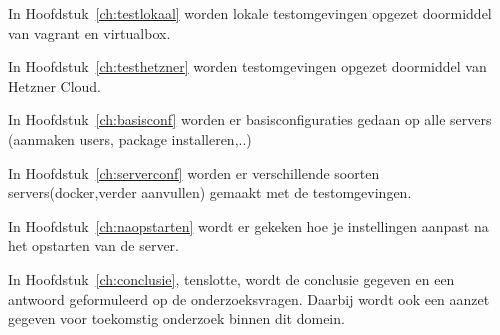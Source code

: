 In Hoofdstuk~\ref{ch:testlokaal} worden lokale testomgevingen  opgezet doormiddel van vagrant en virtualbox.


In Hoofdstuk~\ref{ch:testhetzner} worden testomgevingen opgezet doormiddel van Hetzner Cloud.

In Hoofdstuk~\ref{ch:basisconf} worden er basisconfiguraties gedaan op alle servers (aanmaken users, package installeren,..)

In Hoofdstuk~\ref{ch:serverconf} worden er verschillende soorten servers(docker,verder aanvullen) gemaakt met de testomgevingen.

In Hoofdstuk~\ref{ch:naopstarten} wordt er gekeken hoe je instellingen aanpast na het opstarten van de server.


In Hoofdstuk~\ref{ch:conclusie}, tenslotte, wordt de conclusie gegeven en een antwoord geformuleerd op de onderzoeksvragen. Daarbij wordt ook een aanzet gegeven voor toekomstig onderzoek binnen dit domein.